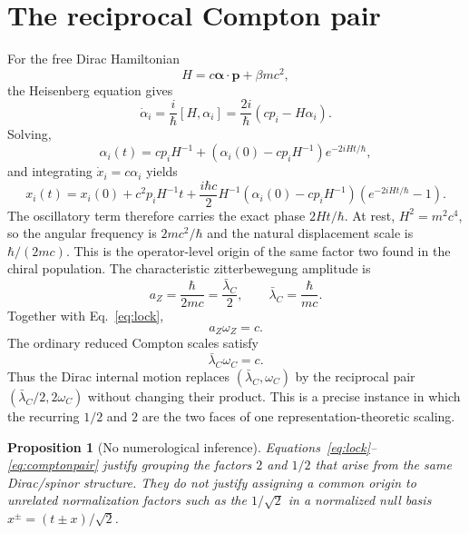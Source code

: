 \documentclass[11pt]{article}
\newtheorem{proposition}[theorem]{Proposition}
\theoremstyle{definition}\newtheorem{definition}[theorem]{Definition}
\theoremstyle{remark}\newtheorem{remark}[theorem]{Remark}\newtheorem{conjecture}[theorem]{Conjecture}
\begin{document}
\section{The reciprocal Compton pair}
For the free Dirac Hamiltonian
\begin{equation}
 H=c\bm\alpha\cdot\bm p+\beta mc^2,
\end{equation}
the Heisenberg equation gives
\begin{equation}
 \dot\alpha_i=\frac{i}{\hbar}[H,\alpha_i]
 =\frac{2i}{\hbar}(c p_i-H\alpha_i).
\end{equation}
Solving,
\begin{equation}\label{eq:alphaH}
 \alpha_i(t)=c p_iH^{-1}+\left(\alpha_i(0)-c p_iH^{-1}\right)e^{-2iHt/\hbar},
\end{equation}
and integrating $\dot x_i=c\alpha_i$ yields
\begin{equation}\label{eq:xH}
 x_i(t)=x_i(0)+c^2p_iH^{-1}t+\frac{i\hbar c}{2}H^{-1}
 \left(\alpha_i(0)-c p_iH^{-1}\right)\left(e^{-2iHt/\hbar}-1\right).
\end{equation}
The oscillatory term therefore carries the exact phase $2Ht/\hbar$. At rest, $H^2=m^2c^4$, so the angular frequency is $2mc^2/\hbar$ and the natural displacement scale is $\hbar/(2mc)$. This is the operator-level origin of the same factor two found in the chiral population. The characteristic zitterbewegung amplitude is
\begin{equation}
 a_Z=\frac{\hbar}{2mc}=\frac{\bar\lambda_C}{2},
 \qquad
 \bar\lambda_C=\frac{\hbar}{mc}.
\end{equation}
Together with Eq.~\eqref{eq:lock},
\begin{equation}\label{eq:azwz}
 \boxed{a_Z\omega_Z=c}.
\end{equation}
The ordinary reduced Compton scales satisfy
\begin{equation}\label{eq:comptonpair}
 \boxed{\bar\lambda_C\omega_C=c}.
\end{equation}
Thus the Dirac internal motion replaces $(\bar\lambda_C,\omega_C)$ by the reciprocal pair $(\bar\lambda_C/2,2\omega_C)$ without changing their product. This is a precise instance in which the recurring $1/2$ and $2$ are the two faces of one representation-theoretic scaling.

\begin{proposition}[No numerological inference]\label{prop:numerology}
Equations~\eqref{eq:lock}--\eqref{eq:comptonpair} justify grouping the factors $2$ and $1/2$ that arise from the same Dirac/spinor structure. They do not justify assigning a common origin to unrelated normalization factors such as the $1/\sqrt2$ in a normalized null basis $x^\pm=(t\pm x)/\sqrt2$.
\end{proposition}
\end{document}

